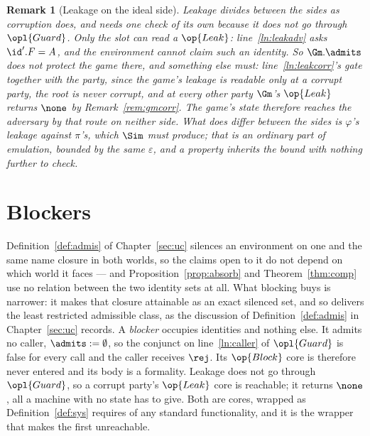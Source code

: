 \documentclass[10pt,oneside,openany]{book}
\theoremstyle{accentdef}
\newtheorem{remark}[definition]{Remark}
\theoremstyle{accentplain}
\begin{document}
\begin{remark}[Leakage on the ideal side]\label{rem:propleak}
Leakage divides between the sides as corruption does, and needs one check of its own because it does
not go through
$\opl{Guard}$. Only the slot can read a $\op{Leak}$: line~\ref{ln:leakadv} asks $\id'.F = A$, and the
environment cannot claim such an identity. So $\Gm.\admits$ does not protect the game there, and
something else must: line~\ref{ln:leakcorr}'s gate together with the party, since the game's leakage is
readable only at a corrupt party, the root is never corrupt, and at every other party $\Gm$'s
$\op{Leak}$ returns $\none$ by Remark~\ref{rem:gmcorr}. The game's state therefore reaches the
adversary by that route on neither side. What does differ between the sides is $\varphi$'s leakage
against $\pi$'s, which $\Sim$ must produce; that is an ordinary part of emulation, bounded by the same
$\varepsilon$, and a property inherits the bound with nothing further to check.
\end{remark}



\chapter{Blockers}\label{sec:blockers}

Definition~\ref{def:admis} of Chapter~\ref{sec:uc} silences an environment on one and the same
name closure in both worlds, so the claims open to it do not depend on which world it faces ---
and Proposition~\ref{prop:absorb} and Theorem~\ref{thm:comp} use no relation between the two
identity sets at all.
What blocking buys is narrower: it makes that closure attainable as an exact
silenced set, and so delivers the least restricted admissible class, as the discussion of
Definition~\ref{def:admis} in Chapter~\ref{sec:uc} records. A \emph{blocker} occupies identities and nothing else. It admits no
caller, $\admits := \emptyset$, so the conjunct on line~\ref{ln:caller} of $\opl{Guard}$ is false
for every call and the caller receives $\rej$. Its $\op{Block}$ core is therefore never entered and
its body is a formality. Leakage does not go through $\opl{Guard}$, so a corrupt party's
$\op{Leak}$ core is reachable; it returns $\none$, all a machine with no state has to give. Both
are cores, wrapped as Definition~\ref{def:sys} requires of any standard functionality, and it is
the wrapper that makes the first unreachable.
\end{document}

